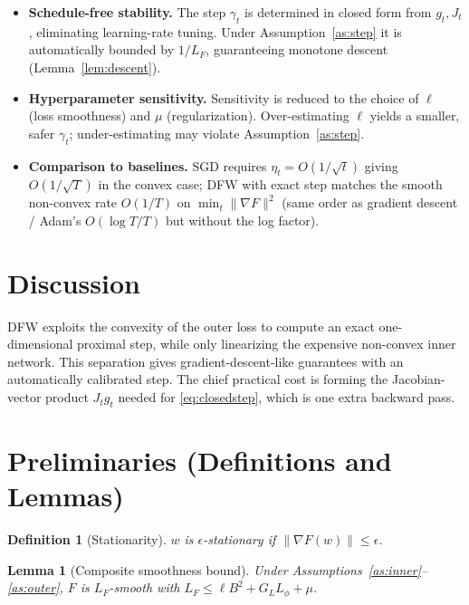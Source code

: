 \documentclass[11pt]{article}
\newtheorem{lemma}{Lemma}
\newtheorem{definition}{Definition}
\begin{document}
\begin{itemize}
  \item \textbf{Schedule-free stability.} The step $\gamma_t$ is determined in
        closed form from $g_t,J_t$, eliminating learning-rate tuning. Under
        Assumption~\ref{as:step} it is automatically bounded by $1/L_F$,
        guaranteeing monotone descent (Lemma~\ref{lem:descent}).
  \item \textbf{Hyperparameter sensitivity.} Sensitivity is reduced to the
        choice of $\ell$ (loss smoothness) and $\mu$ (regularization).
        Over-estimating $\ell$ yields a smaller, safer $\gamma_t$;
        under-estimating may violate Assumption~\ref{as:step}.
  \item \textbf{Comparison to baselines.} SGD requires
        $\eta_t = O(1/\sqrt t)$ giving $O(1/\sqrt T)$ in the convex case;
        DFW with exact step matches the smooth non-convex rate $O(1/T)$ on
        $\min_t\|\nabla F\|^2$ (same order as gradient descent / Adam's
        $O(\log T/T)$ but without the log factor).
\end{itemize}

\section*{Discussion}
DFW exploits the convexity of the outer loss to compute an exact one-dimensional
proximal step, while only linearizing the expensive non-convex inner network.
This separation gives gradient-descent-like guarantees with an automatically
calibrated step. The chief practical cost is forming the Jacobian-vector product
$J_t g_t$ needed for \eqref{eq:closedstep}, which is one extra backward pass.

\section*{Preliminaries (Definitions and Lemmas)}

\begin{definition}[Stationarity]
$w$ is $\epsilon$-stationary if $\|\nabla F(w)\| \le \epsilon$.
\end{definition}

\begin{lemma}[Composite smoothness bound]\label{lem:smooth}
Under Assumptions~\ref{as:inner}--\ref{as:outer}, $F$ is $L_F$-smooth with
$L_F \le \ell B^2 + G_L L_\phi + \mu$.
\end{lemma}
\end{document}
